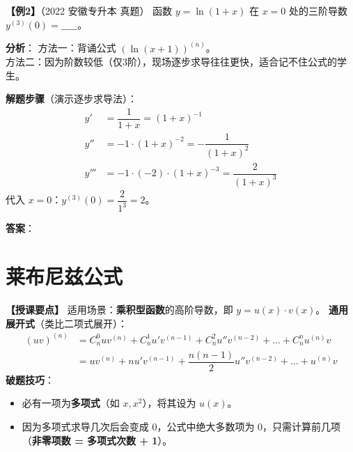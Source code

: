 \documentclass[12pt,a4paper]{article}
\begin{document}
\vspace{2em}

\textbf{【例2】}（2022 安徽专升本 真题）
函数 $y = \ln(1+x)$ 在 $x=0$ 处的三阶导数 $y^{(3)}(0) = \_\_\_\_\_$。

\begin{tiptip}
\textbf{分析}：
方法一：背诵公式 $(\ln(x+1))^{(n)}$。\\
方法二：因为阶数较低（仅3阶），现场逐步求导往往更快，适合记不住公式的学生。
\end{tiptip}

\textbf{解题步骤}（演示逐步求导法）：
\begin{align*}
y' &= \dfrac{1}{1+x} = (1+x)^{-1} \\
y'' &= -1 \cdot (1+x)^{-2} = -\dfrac{1}{(1+x)^2} \\
y''' &= -1 \cdot (-2) \cdot (1+x)^{-3} = \dfrac{2}{(1+x)^3}
\end{align*}
代入 $x=0$：$y^{(3)}(0) = \dfrac{2}{1^3} = 2$。

\textbf{答案}：

\newpage

\section{莱布尼兹公式}

\textbf{【授课要点】}
适用场景：\textbf{乘积型函数}的高阶导数，即 $y=u(x) \cdot v(x)$。
\textbf{通用展开式}（类比二项式展开）：
\begin{align*}
(uv)^{(n)} &= C_n^0 u v^{(n)} + C_n^1 u' v^{(n-1)} + C_n^2 u'' v^{(n-2)} + \dots + C_n^n u^{(n)} v \\
&= u v^{(n)} + n u' v^{(n-1)} + \dfrac{n(n-1)}{2} u'' v^{(n-2)} + \dots + u^{(n)} v
\end{align*}
\textbf{破题技巧}：
\begin{itemize}
    \item 必有一项为\textbf{多项式}（如 $x, x^2$），将其设为 $u(x)$。
    \item 因为多项式求导几次后会变成 0，公式中绝大多数项为 0，只需计算前几项（\textbf{非零项数 = 多项式次数 + 1}）。
\end{itemize}
\end{document}
